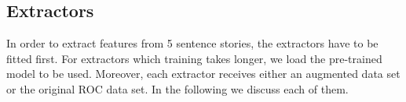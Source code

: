 \documentclass{article}
\begin{document}
\subsection{Extractors}

In order to extract features from 5 sentence stories, the extractors have to be
fitted first. For extractors which training takes longer, we load the
pre-trained model to be used. Moreover, each extractor receives either an
augmented data set or the original ROC data set. In the following we discuss each of them.


\end{document}
